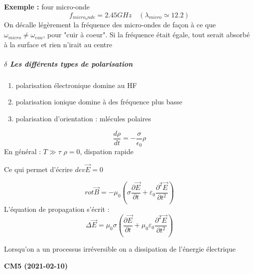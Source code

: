 \documentclass[12pt,a4paper]{report}
\begin{document}
\textbf{Exemple :} four micro-onde
\[
	f_{micro_onde} = 2.45GHz \quad	(\lambda_{micro} \simeq 12.2)
\]
On décalle légèrement la fréquence des micro-ondes de façon à ce que \(\omega_{micro} \neq \omega_{eau}\), pour "cuir à coeur". Si la fréquence était égale, tout serait absorbé à la surface et rien n'irait au centre

\subparagraph{$\delta$ Les différents types de polarisation}

\begin{enumerate}
	\item polarisation électronique domine au HF
	\item polarisation ionique domine à des fréquence plus basse
	\item polarisation d'orientation : mlécules polaires
\end{enumerate}

\[
	\dfrac{d\rho}{dt} = -\dfrac{\sigma}{\epsilon_0}\rho
\]
En général : \(T \gg \tau\)
\(\rho = 0\), dispation rapide

Ce qui permet d'écrire \(dev\vec{E} = 0\)

\[
	rot \vec{B} = -\mu_0 \left( \sigma \dfrac{\partial \vec{E}}{\partial t} + \varepsilon_0 \dfrac{\partial^2 \vec{E}}{\partial t^2}\right)
\]
L'équation de propagation s'écrit :
\[
	\Delta \vec{E} = \mu_0 \sigma \left( \dfrac{\partial \vec{E}}{\partial t} + \mu_0\varepsilon_0 \dfrac{\partial^2 \vec{E}}{\partial t^2}\right)
\]

Lorsqu'on a un processus irréversible on a dissipation de l'énergie électrique

\begin{center}
\textbf{CM5 (2021-02-10)}
\end{center}
\end{document}
